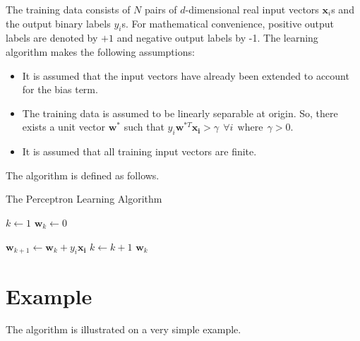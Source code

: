 \documentclass[11pt, a4paper]{article}
\begin{document}
The training data consists of $N$ pairs of $d$-dimensional real input vectors $\boldsymbol{x}_i$s and the output binary labels $y_i$s. For mathematical convenience, positive output labels are denoted by $+1$ and negative output labels by {-1}. 
The learning algorithm makes the following assumptions:

\begin{itemize}
	\item It is assumed that the input vectors have already been extended to account for the bias term.
	\item The training data is assumed to be linearly separable at origin. So, there exists a unit vector $\boldsymbol{w}^*$ such that $y_i\boldsymbol{w}^{*T}\boldsymbol{x_i} > \gamma \ \ \forall i \ \ \text{where}\ \ \gamma > 0$.
	\item It is assumed that all training input vectors are finite.
\end{itemize} 

The algorithm is defined as follows.

\begin{algorithm}
	\renewcommand{\thealgorithm}{}
	\caption{The Perceptron Learning Algorithm}
	\begin{algorithmic} 
		\STATE $k \leftarrow 1$
		\STATE $\boldsymbol{w}_k \leftarrow 0$
						
		\STATE $\boldsymbol{w}_{k+1} \leftarrow \boldsymbol{w}_k + y_i \boldsymbol{\boldsymbol{x}_i}$
		\STATE $ k \leftarrow k + 1$
		\ENDWHILE
		\RETURN $\boldsymbol{w}_k$
	\end{algorithmic}
\end{algorithm}

\section{Example}

The algorithm is illustrated on a very simple example.
\end{document}
